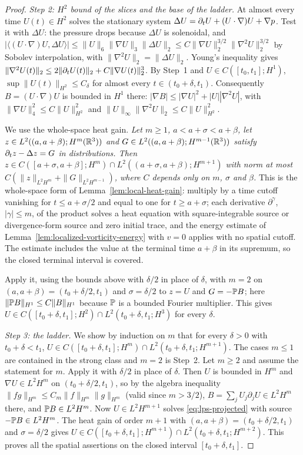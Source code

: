 \documentclass[11pt,letterpaper]{article}
\numberwithin{equation}{section}
\theoremstyle{plain}
\theoremstyle{definition}
\theoremstyle{remark}
\begin{document}
\begin{proof}
\emph{Step 2: $H^2$ bound of the slices and the base of the ladder.}
At almost every time $U(t)\in H^2$ solves the stationary system
$\Delta U=\partial_t U+(U\cdot\nabla)U+\nabla p$. Test it with $\Delta U$: the
pressure drops because $\Delta U$ is solenoidal, and
$|\langle(U\cdot\nabla)U,\Delta U\rangle|\le\|U\|_6\|\nabla U\|_3\|\Delta U\|_2
\le C\|\nabla U\|_2^{3/2}\|\nabla^2U\|_2^{3/2}$ by Sobolev interpolation, with
$\|\nabla^2U\|_2=\|\Delta U\|_2$. Young's inequality gives
$\|\nabla^2U(t)\|_2\le2\|\partial_t U(t)\|_2+C\|\nabla U(t)\|_2^3$. By Step~1 and
$U\in C([t_0,t_1];H^1)$, $\sup\|U(t)\|_{H^2}\le C_\delta$ for almost every
$t\in(t_0+\delta,t_1)$. Consequently $B=(U\cdot\nabla)U$ is bounded in $H^1$
there: $|\nabla B|\le|\nabla U|^2+|U||\nabla^2U|$, with
$\|\nabla U\|_4^2\le C\|U\|_{H^2}^2$ and
$\|U\|_\infty\|\nabla^2U\|_2\le C\|U\|_{H^2}^2$.

We use the whole-space heat gain. \emph{Let $m\ge1$, $a<a+\sigma<a+\beta$,
let $z\in L^2((a,a+\beta);H^m(\mathbb{R}^3))$ and $G\in L^2((a,a+\beta);H^{m-1}(\mathbb{R}^3))$
satisfy $\partial_t z-\Delta z=G$ in distributions. Then
$z\in C([a+\sigma,a+\beta];H^m)\cap L^2((a+\sigma,a+\beta);H^{m+1})$ with norm
at most $C(\|z\|_{L^2H^m}+\|G\|_{L^2H^{m-1}})$, where $C$ depends only on
$m$, $\sigma$ and $\beta$.} This is the whole-space form of
Lemma~\ref{lem:local-heat-gain}: multiply by a time cutoff vanishing for
$t\le a+\sigma/2$ and equal to one for $t\ge a+\sigma$; each derivative
$\partial^\gamma$, $|\gamma|\le m$, of the product solves a heat equation with
square-integrable source or divergence-form source and zero initial trace, and
the energy estimate of Lemma~\ref{lem:localized-vorticity-energy} with $v=0$
applies with no spatial cutoff. The estimate includes the value at the
terminal time $a+\beta$ in its supremum, so the closed terminal interval is
covered.

Apply it, using the bounds above with $\delta/2$ in place of $\delta$, with
$m=2$ on $(a,a+\beta)=(t_0+\delta/2,t_1)$ and $\sigma=\delta/2$
to $z=U$ and $G=-\mathbb{P} B$; here $\|\mathbb{P} B\|_{H^1}\le C\|B\|_{H^1}$ because
$\mathbb{P}$ is a bounded Fourier multiplier. This gives $U\in C([t_0+\delta,t_1];H^2)\cap
L^2(t_0+\delta,t_1;H^3)$ for every $\delta$.

\emph{Step 3: the ladder.} We show by induction on $m$ that for every
$\delta>0$ with $t_0+\delta<t_1$, $U\in C([t_0+\delta,t_1];H^m)\cap
L^2(t_0+\delta,t_1;H^{m+1})$. The cases $m\le1$ are contained in the strong
class and $m=2$ is Step~2. Let $m\ge2$ and assume the statement for $m$.
Apply it with $\delta/2$ in place of $\delta$. Then $U$ is bounded in
$H^m$ and $\nabla U\in L^2H^m$ on $(t_0+\delta/2,t_1)$, so by the algebra
inequality $\|fg\|_{H^m}\le C_m\|f\|_{H^m}\|g\|_{H^m}$ (valid since
$m>3/2$), $B=\sum_jU_j\partial_jU\in L^2H^m$ there, and $\mathbb{P} B\in L^2H^m$.
Now $U\in L^2H^{m+1}$ solves \eqref{eq:lps-projected} with source
$-\mathbb{P} B\in L^2H^m$. The heat gain of order $m+1$ with
$(a,a+\beta)=(t_0+\delta/2,t_1)$ and $\sigma=\delta/2$ gives
$U\in C([t_0+\delta,t_1];H^{m+1})\cap L^2(t_0+\delta,t_1;H^{m+2})$.
This proves all the spatial assertions on the closed interval $[t_0+\delta,t_1]$.


\end{proof}
\end{document}
